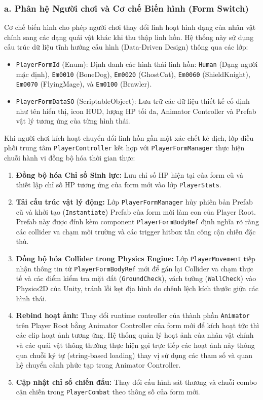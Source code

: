 \documentclass[../DoAn.tex]{subfiles}
\begin{document}
\subsubsection{a. Phân hệ Người chơi và Cơ chế Biến hình (Form Switch)}
Cơ chế biến hình cho phép người chơi thay đổi linh hoạt hình dạng của nhân vật chính sang các dạng quái vật khác khi thu thập linh hồn. Hệ thống này sử dụng cấu trúc dữ liệu tĩnh hướng cấu hình (Data-Driven Design) thông qua các lớp:
\begin{itemize}
    \item \texttt{PlayerFormId} (Enum): Định danh các hình thái linh hồn: \texttt{Human} (Dạng người mặc định), \texttt{Em0010} (BoneDog), \texttt{Em0020} (GhostCat), \texttt{Em0060} (ShieldKnight), \texttt{Em0070} (FlyingMage), và \texttt{Em0100} (Brawler).
    \item \texttt{PlayerFormDataSO} (ScriptableObject): Lưu trữ các dữ liệu thiết kế cố định như tên hiển thị, icon HUD, lượng HP tối đa, Animator Controller và Prefab vật lý tương ứng của từng hình thái.
\end{itemize}

Khi người chơi kích hoạt chuyển đổi linh hồn gần một xác chết kẻ địch, lớp điều phối trung tâm \texttt{PlayerController} kết hợp với \texttt{PlayerFormManager} thực hiện chuỗi hành vi đồng bộ hóa thời gian thực:
\begin{enumerate}
    \item \textbf{Đồng bộ hóa Chỉ số Sinh lực:} Lưu chỉ số HP hiện tại của form cũ và thiết lập chỉ số HP tương ứng của form mới vào lớp \texttt{PlayerStats}.
    \item \textbf{Tải cấu trúc vật lý động:} Lớp \texttt{PlayerFormManager} hủy phiên bản Prefab cũ và khởi tạo (\texttt{Instantiate}) Prefab của form mới làm con của Player Root. Prefab này được đính kèm component \texttt{PlayerFormBodyRef} định nghĩa rõ ràng các collider va chạm môi trường và các trigger hitbox tấn công cận chiến đặc thù.
    \item \textbf{Đồng bộ hóa Collider trong Physics Engine:} Lớp \texttt{PlayerMovement} tiếp nhận thông tin từ \texttt{PlayerFormBodyRef} mới để gán lại Collider va chạm thực tế và các điểm kiểm tra mặt đất (\texttt{GroundCheck}), vách tường (\texttt{WallCheck}) vào Physics2D của Unity, tránh lỗi kẹt địa hình do chênh lệch kích thước giữa các hình thái.
    \item \textbf{Rebind hoạt ảnh:} Thay đổi runtime controller của thành phần \texttt{Animator} trên Player Root bằng Animator Controller của form mới để kích hoạt tức thì các clip hoạt ảnh tương ứng. Hệ thống quản lý hoạt ảnh của nhân vật chính và các quái vật thông thường thực hiện gọi trực tiếp các hoạt ảnh này thông qua chuỗi ký tự (string-based loading) thay vị sử dụng các tham số và quan hệ chuyển cảnh phức tạp trong Animator Controller.
    \item \textbf{Cập nhật chỉ số chiến đấu:} Thay đổi cấu hình sát thương và chuỗi combo cận chiến trong \texttt{PlayerCombat} theo thông số của form mới.
\end{enumerate}
\end{document}
